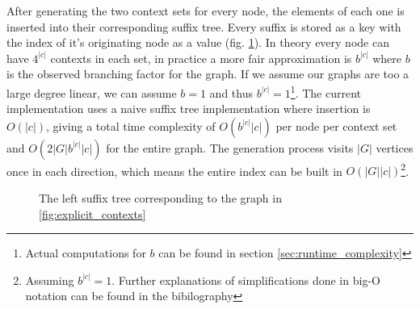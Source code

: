 \documentclass[thesis.tex]{subfiles}
\begin{document}
\par\noindent
After generating the two context sets for every node, the elements of each one is inserted into their corresponding suffix tree. Every suffix is stored as a key with the index of it's originating node as a value (fig. \ref{fig:left_suffix_tree}). In theory every node can have $4^{|c|}$ contexts in each set, in practice a more fair approximation is $b^{|c|}$ where $b$ is the observed branching factor for the graph. If we assume our graphs are too a large degree linear, we can assume $b=1$ and thus $b^{|c|}=1$\footnote{Actual computations for $b$ can be found in section \ref{sec:runtime_complexity}}. The current implementation uses a naive suffix tree implementation where insertion is $O(|c|)$, giving a total time complexity of $O(b^{|c|}|c|)$ per node per context set and $O(2|G|b^{|c|}|c|)$ for the entire graph. The generation process visits $|G|$ vertices once in each direction, which means the entire index can be built in $O(|G||c|)$\footnote{Assuming $b^{|c|}=1$. Further explanations of simplifications done in big-O notation can be found in the bibilography\cite[Chapter 2]{data_structures_and_algorithm_analysis_in_java}\cite[Section 3.1]{algorithms_sequential_parallell_and_distributed}}.
\begin{wrapfigure}{R}{0.49\textwidth}
  \begin{mdframed}
  \end{mdframed}
  \caption{The left suffix tree corresponding to the graph in \ref{fig:explicit_contexts}}
  \label{fig:left_suffix_tree}
\end{wrapfigure}
\end{document}
